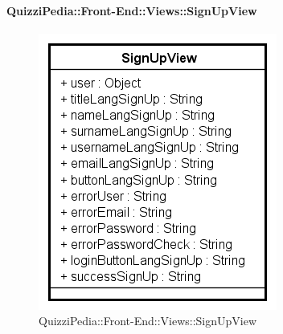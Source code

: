 \paragraph{QuizziPedia::Front-End::Views::SignUpView}

\label{QuizziPedia::Front-End::View::SignUpView}
\begin{figure} [ht]
	\centering
	\includegraphics[scale=0.80]{UML/Classi/Front-End/QuizziPedia_Front-end_Views_SignUpView.png}
	\caption{QuizziPedia::Front-End::Views::SignUpView}
\end{figure} \FloatBarrier
